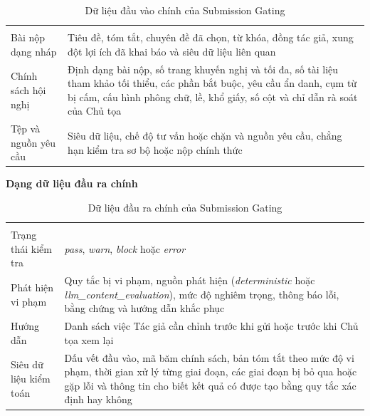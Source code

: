 \begingroup
\setlength{\tabcolsep}{2pt}
\renewcommand{\arraystretch}{1.15}
\begin{longtable}{|C{0.46\textwidth}|P{0.46\textwidth}|}
  \caption{Dữ liệu đầu vào chính của Submission Gating}\label{tab:ch3-gating-input}\\
  \hline
       &     \\ \hline
  \endfirsthead
  \hline
       &     \\ \hline
  \endhead
  Bài nộp dạng nháp   &   Tiêu đề, tóm tắt, chuyên đề đã chọn, từ khóa, đồng tác giả, xung đột lợi ích đã khai báo và siêu dữ liệu liên quan \\ \hline
  Chính sách hội nghị      &      Định dạng bài nộp, số trang khuyến nghị và tối đa, số tài liệu tham khảo tối thiểu, các phần bắt buộc, yêu cầu ẩn danh, cụm từ bị cấm, cấu hình phông chữ, lề, khổ giấy, số cột và chỉ dẫn rà soát của Chủ tọa \\ \hline
  Tệp và nguồn yêu cầu     &     Siêu dữ liệu, chế độ tư vấn hoặc chặn và nguồn yêu cầu, chẳng hạn kiểm tra sơ bộ hoặc nộp chính thức \\ \hline
\end{longtable}
\endgroup

\textbf{Dạng dữ liệu đầu ra chính}

\begingroup
\setlength{\tabcolsep}{2pt}
\renewcommand{\arraystretch}{1.15}
\begin{longtable}{|C{0.46\textwidth}|P{0.46\textwidth}|}
  \caption{Dữ liệu đầu ra chính của Submission Gating}\label{tab:ch3-gating-output}\\
  \hline
       &     \\ \hline
  \endfirsthead
  \hline
       &     \\ \hline
  \endhead
  Trạng thái kiểm tra  &   \textit{pass}, \textit{warn}, \textit{block} hoặc \textit{error} \\ \hline
  Phát hiện vi phạm     &      Quy tắc bị vi phạm, nguồn phát hiện (\textit{deterministic} hoặc \textit{llm\_content\_evaluation}), mức độ nghiêm trọng, thông báo lỗi, bằng chứng và hướng dẫn khắc phục \\ \hline
  Hướng dẫn     &     Danh sách việc Tác giả cần chỉnh trước khi gửi hoặc trước khi Chủ tọa xem lại \\ \hline
  Siêu dữ liệu kiểm toán      &      Dấu vết đầu vào, mã băm chính sách, bản tóm tắt theo mức độ vi phạm, thời gian xử lý từng giai đoạn, các giai đoạn bị bỏ qua hoặc gặp lỗi và thông tin cho biết kết quả có được tạo bằng quy tắc xác định hay không \\ \hline
\end{longtable}
\endgroup


